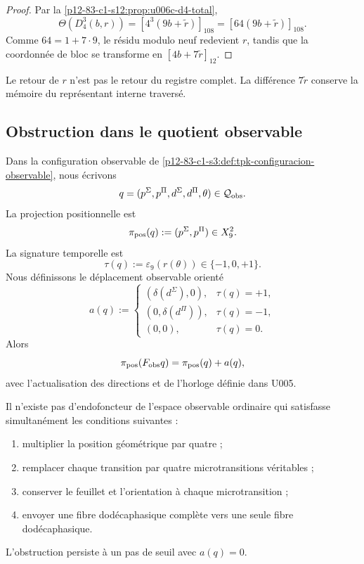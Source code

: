 \begin{proof}
Par la \cref{p12-83-c1-s12:prop:u006c-d4-total},
\[
 \Theta(D_4^3(b,r))
 =[4^3(9b+\widetilde r)]_{108}
 =[64(9b+\widetilde r)]_{108}.
\]
Comme \(64=1+7\cdot9\), le résidu modulo neuf redevient \(r\), tandis que
la coordonnée de bloc se transforme en
\([4b+7\widetilde r]_{12}\).
\end{proof}

Le retour de \(r\) n’est pas le retour du registre complet. La différence
\(7\widetilde r\) conserve la mémoire du représentant interne traversé.

\subsection{Obstruction dans le quotient observable}

Dans la configuration observable de
\cref{p12-83-c1-s3:def:tpk-configuracion-observable}, nous écrivons
\[
 q=(p^\Sigma,p^\Pi,d^\Sigma,d^\Pi,\theta)
 \in\mathcal Q_{\rm obs}.
\]
La projection positionnelle est
\begin{equation}
 \pi_{\rm pos}(q):=(p^\Sigma,p^\Pi)\in X_9^2.
 \label{p12-83-c1-s12:eq:u006c-proyeccion-posicional}
\end{equation}
La signature temporelle est
\[
 \tau(q):=\varepsilon_9(r(\theta))\in\{-1,0,+1\}.
\]
Nous définissons le déplacement observable orienté
\begin{equation}
 a(q):=
 \begin{cases}
  (\delta(d^\Sigma),0),&\tau(q)=+1,\\
  (0,\delta(d^\Pi)),&\tau(q)=-1,\\
  (0,0),&\tau(q)=0.
 \end{cases}
 \label{p12-83-c1-s12:eq:u006c-desplazamiento-observable}
\end{equation}
Alors
\[
 \pi_{\rm pos}(F_{\rm obs}q)=\pi_{\rm pos}(q)+a(q),
\]
avec l’actualisation des directions et de l’horloge définie dans U005.

\begin{theorem}
\label{p12-83-c1-s12:thm:u006c-obstruccion}
Il n’existe pas d’endofoncteur de l’espace observable ordinaire qui satisfasse
simultanément les conditions suivantes :
\begin{enumerate}
 \item multiplier la position géométrique par quatre ;
 \item remplacer chaque transition par quatre microtransitions véritables ;
 \item conserver le feuillet et l’orientation à chaque microtransition ;
 \item envoyer une fibre dodécaphasique complète vers une seule fibre
 dodécaphasique.
\end{enumerate}
L’obstruction persiste à un pas de seuil avec \(a(q)=0\).
\end{theorem}

